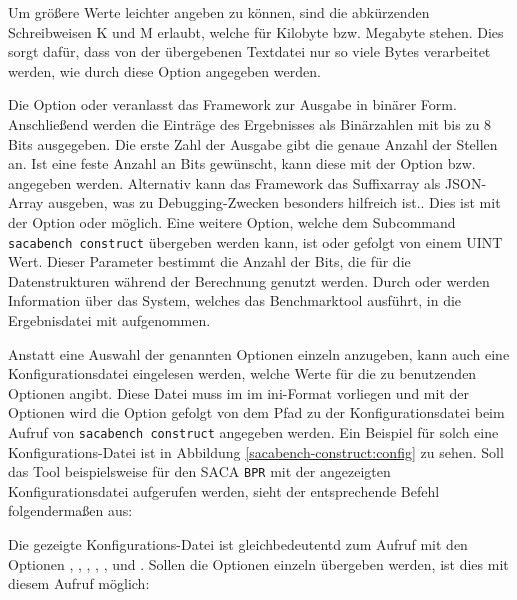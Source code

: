 Um größere Werte leichter angeben zu können, sind die abkürzenden Schreibweisen K und M erlaubt, welche für Kilobyte bzw. Megabyte stehen.
Dies sorgt dafür, dass von der übergebenen Textdatei nur so viele Bytes verarbeitet werden, wie durch diese Option angegeben werden.\par
Die Option  oder  veranlasst das Framework zur Ausgabe in binärer Form.
Anschließend werden die Einträge des Ergebnisses als Binärzahlen mit bis zu 8 Bits ausgegeben.
Die erste Zahl der Ausgabe gibt die genaue Anzahl der Stellen an.
Ist eine feste Anzahl an Bits gewünscht, kann diese mit der Option  bzw.  angegeben werden.
Alternativ kann das Framework das Suffixarray als JSON-Array ausgeben, was zu Debugging-Zwecken besonders hilfreich ist.. 
Dies ist mit der Option  oder  möglich.
Eine weitere Option, welche dem Subcommand \texttt{sacabench construct} übergeben werden kann, ist  oder  gefolgt von einem UINT Wert. 
Dieser Parameter bestimmt die Anzahl der Bits, die für die Datenstrukturen während der Berechnung genutzt werden.
Durch  oder  werden Information über das System, welches das Benchmarktool ausführt, in die Ergebnisdatei mit aufgenommen.\par
Anstatt eine Auswahl der genannten Optionen einzeln anzugeben, kann auch eine Konfigurationsdatei eingelesen werden, welche Werte für die zu benutzenden Optionen angibt.
Diese Datei muss im im ini-Format vorliegen und mit der Optionen wird die Option  gefolgt von dem Pfad zu der Konfigurationsdatei beim Aufruf von \texttt{sacabench construct} angegeben werden.
Ein Beispiel für solch eine Konfigurations-Datei ist in Abbildung \ref{sacabench-construct:config} zu sehen.
Soll das Tool beispielsweise für den SACA \texttt{BPR} mit der angezeigten Konfigurationsdatei aufgerufen werden, sieht der entsprechende Befehl folgendermaßen aus:


Die gezeigte Konfigurations-Datei ist gleichbedeutentd zum Aufruf mit den Optionen , , , , ,  und .
Sollen die Optionen einzeln übergeben werden, ist dies mit diesem Aufruf möglich:

\par

